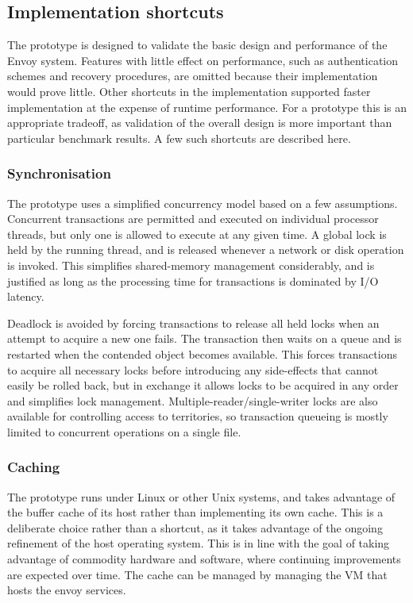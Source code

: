\subsection{Implementation shortcuts}

The prototype is designed to validate the basic design and performance of the Envoy system. Features with little effect on performance, such as authentication schemes and recovery procedures, are omitted because their implementation would prove little. Other shortcuts in the implementation supported faster implementation at the expense of runtime performance. For a prototype this is an appropriate tradeoff, as validation of the overall design is more important than particular benchmark results. A few such shortcuts are described here.

\subsubsection{Synchronisation}

The prototype uses a simplified concurrency model based on a few assumptions. Concurrent transactions are permitted and executed on individual processor threads, but only one is allowed to execute at any given time. A global lock is held by the running thread, and is released whenever a network or disk operation is invoked. This simplifies shared-memory management considerably, and is justified as long as the processing time for transactions is dominated by I/O latency.

Deadlock is avoided by forcing transactions to release all held locks when an attempt to acquire a new one fails. The transaction then waits on a queue and is restarted when the contended object becomes available. This forces transactions to acquire all necessary locks before introducing any side-effects that cannot easily be rolled back, but in exchange it allows locks to be acquired in any order and simplifies lock management. Multiple-reader/single-writer locks are also available for controlling access to territories, so transaction queueing is mostly limited to concurrent operations on a single file.

\subsubsection{Caching}

The prototype runs under Linux or other Unix systems, and takes advantage of the buffer cache of its host rather than implementing its own cache. This is a deliberate choice rather than a shortcut, as it takes advantage of the ongoing refinement of the host operating system. This is in line with the goal of taking advantage of commodity hardware and software, where continuing improvements are expected over time. The cache can be managed by managing the VM that hosts the envoy services.

